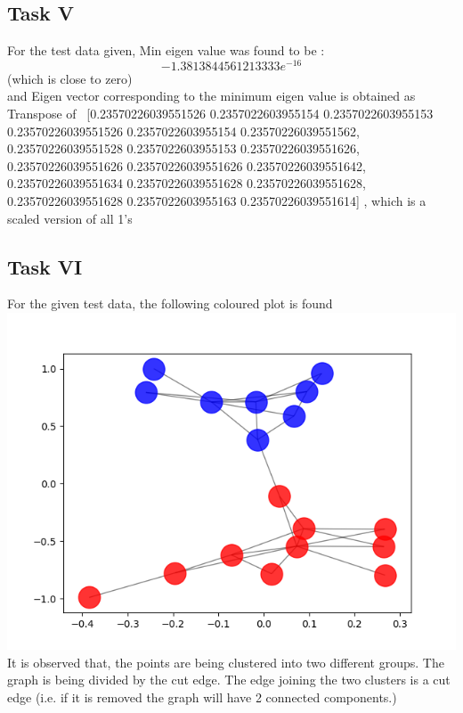 \documentclass[runningheads]{llncs}
\begin{document}
\subsection{Task V}
For the test data given, 
Min eigen value was found to be : \[-1.3813844561213333e^{-16}\]  (which is close to zero)\\
and Eigen vector corresponding to the minimum eigen value is obtained as 
Transpose of \
[0.23570226039551526 0.2357022603955154 0.2357022603955153\\
0.23570226039551526 0.2357022603955154 0.23570226039551562,\\
0.23570226039551528 0.2357022603955153 0.23570226039551626,\\
0.23570226039551626 0.23570226039551626 0.23570226039551642,\\
0.23570226039551634 0.23570226039551628 0.23570226039551628,\\
0.23570226039551628 0.2357022603955163 0.23570226039551614] , which is a scaled version of all 1's


\subsection{Task VI}
For the given test data, the following coloured plot is found \\
\includegraphics[scale=0.5]{problem_1_task_6} \\
It is observed that, the points are being clustered into two different groups.
The graph is being divided by the cut edge. The edge joining the two clusters is a cut edge (i.e. if it is removed the graph will have 2 connected components.)
\end{document}
